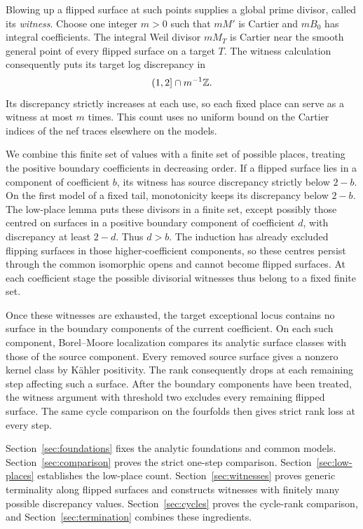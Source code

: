 Blowing up a flipped surface at such points supplies a global prime
divisor, called its \emph{witness}. Choose one integer $m>0$ such that
$mM'$ is Cartier and $mB_0$ has integral coefficients. The integral
Weil divisor $mM_T$ is Cartier near the smooth general point of every
flipped surface on a target $T$. The witness calculation consequently
puts its target log discrepancy in
\[
 (1,2]\cap m^{-1}\mathbb Z.
\]
Its discrepancy strictly increases at each use, so each fixed place
can serve as a witness at most $m$ times. This count uses no uniform
bound on the Cartier indices of the nef traces elsewhere on the models.

We combine this finite set of values with a finite set of possible
places, treating the positive boundary coefficients in decreasing
order. If a flipped surface lies in a component of coefficient $b$,
its witness has source discrepancy strictly below $2-b$.
On the first model of a fixed tail, monotonicity keeps its discrepancy
below $2-b$. The low-place lemma puts these divisors in a finite set,
except possibly those centred on surfaces in a positive boundary
component of coefficient $d$, with discrepancy at least $2-d$. Thus $d>b$.
The induction has already
excluded flipping surfaces in those higher-coefficient components,
so these centres persist through the common isomorphic opens and
cannot become flipped surfaces. At each coefficient stage the
possible divisorial witnesses thus belong to a fixed finite set.

Once these witnesses are exhausted, the target exceptional locus
contains no surface in the boundary components of the current
coefficient. On each such component,
Borel--Moore localization compares
its analytic surface classes with those of the source component.
Every removed source surface gives a nonzero kernel class by
K\"ahler positivity. The rank consequently drops at each remaining
step affecting such a surface. After the boundary components have
been treated, the witness argument with threshold two excludes every
remaining flipped surface. The same cycle comparison on the fourfolds
then gives strict rank loss at every step.

Section~\ref{sec:foundations} fixes the analytic foundations and
common models. Section~\ref{sec:comparison} proves the strict
one-step comparison. Section~\ref{sec:low-places} establishes the
low-place count. Section~\ref{sec:witnesses} proves generic
terminality along flipped surfaces and constructs witnesses with
finitely many possible discrepancy values. Section~\ref{sec:cycles} proves the
cycle-rank comparison, and Section~\ref{sec:termination} combines
these ingredients.
